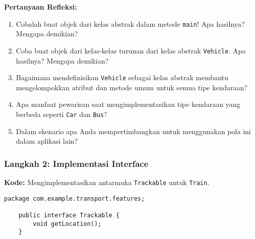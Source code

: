 \textbf{Pertanyaan Refleksi:}
\begin{enumerate}
	\item Cobalah buat objek dari kelas abstrak dalam metode \texttt{main}! Apa hasilnya? Mengapa demikian?
	\begin{tcolorbox}[colback=white, colframe=black,  width=\linewidth, height=3cm, boxrule=1pt, sharp corners]
	\end{tcolorbox}
	\item Coba buat objek dari kelas-kelas turunan dari kelas abstrak \texttt{Vehicle}. Apa hasilnya? Mengapa demikian?
	\begin{tcolorbox}[colback=white, colframe=black,  width=\linewidth, height=3cm, boxrule=1pt, sharp corners]
	\end{tcolorbox}
	\item Bagaimana mendefinisikan \texttt{Vehicle} sebagai kelas abstrak membantu mengelompokkan atribut dan metode umum untuk semua tipe kendaraan?
	\begin{tcolorbox}[colback=white, colframe=black, width=\linewidth, height=3cm, boxrule=1pt, sharp corners]
	\end{tcolorbox}
	\item Apa manfaat pewarisan saat mengimplementasikan tipe kendaraan yang berbeda seperti \texttt{Car} dan \texttt{Bus}?
	\begin{tcolorbox}[colback=white, colframe=black, width=\linewidth, height=3cm, boxrule=1pt, sharp corners]
	\end{tcolorbox}
	\item Dalam skenario apa Anda mempertimbangkan untuk menggunakan pola ini dalam aplikasi lain?
	\begin{tcolorbox}[colback=white, colframe=black, width=\linewidth, height=3cm, boxrule=1pt, sharp corners]
	\end{tcolorbox}
\end{enumerate}

\subsubsection{Langkah 2: Implementasi Interface}

\textbf{Kode:} Mengimplementasikan antarmuka \texttt{Trackable} untuk \texttt{Train}.

\begin{lstlisting}[style=JavaStyle, caption={Trackable.java}]
	package com.example.transport.features;
	
	public interface Trackable {
		void getLocation();
	}
\end{lstlisting}

